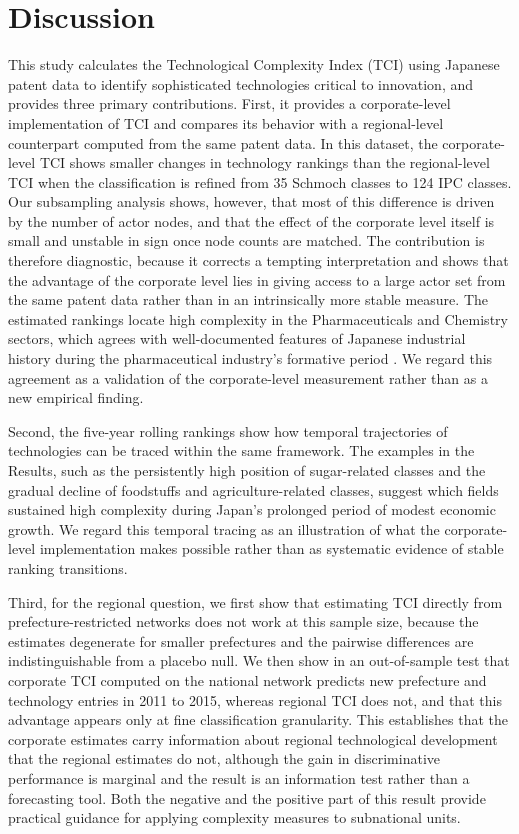 \documentclass[lineno,pdflatex,sn-mathphys-num]{sn-jnl}%
\theoremstyle{thmstyleone}%
\theoremstyle{thmstyletwo}%
\theoremstyle{thmstylethree}%
\begin{document}
\section{Discussion}\label{section:Discussion}

This study calculates the Technological Complexity Index (TCI) using Japanese patent data to identify sophisticated technologies critical to innovation, and provides three primary contributions.
First, it provides a corporate-level implementation of TCI and compares its behavior with a regional-level counterpart computed from the same patent data.
In this dataset, the corporate-level TCI shows smaller changes in technology rankings than the regional-level TCI when the classification is refined from 35 Schmoch classes to 124 IPC classes.
Our subsampling analysis shows, however, that most of this difference is driven by the number of actor nodes, and that the effect of the corporate level itself is small and unstable in sign once node counts are matched.
The contribution is therefore diagnostic, because it corrects a tempting interpretation and shows that the advantage of the corporate level lies in giving access to a large actor set from the same patent data rather than in an intrinsically more stable measure.
The estimated rankings locate high complexity in the Pharmaceuticals and Chemistry sectors, which agrees with well-documented features of Japanese industrial history during the pharmaceutical industry's formative period \cite{Sakakibara2014,Nakamura2022}.
We regard this agreement as a validation of the corporate-level measurement rather than as a new empirical finding.

Second, the five-year rolling rankings show how temporal trajectories of technologies can be traced within the same framework.
The examples in the Results, such as the persistently high position of sugar-related classes and the gradual decline of foodstuffs and agriculture-related classes, suggest which fields sustained high complexity during Japan's prolonged period of modest economic growth.
We regard this temporal tracing as an illustration of what the corporate-level implementation makes possible rather than as systematic evidence of stable ranking transitions.

Third, for the regional question, we first show that estimating TCI directly from prefecture-restricted networks does not work at this sample size, because the estimates degenerate for smaller prefectures and the pairwise differences are indistinguishable from a placebo null.
We then show in an out-of-sample test that corporate TCI computed on the national network predicts new prefecture and technology entries in 2011 to 2015, whereas regional TCI does not, and that this advantage appears only at fine classification granularity.
This establishes that the corporate estimates carry information about regional technological development that the regional estimates do not, although the gain in discriminative performance is marginal and the result is an information test rather than a forecasting tool.
Both the negative and the positive part of this result provide practical guidance for applying complexity measures to subnational units.
\end{document}
